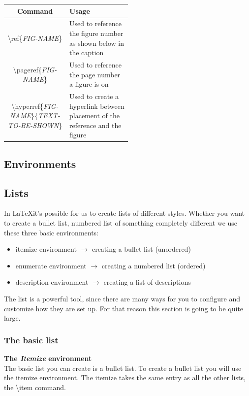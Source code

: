 \documentclass{article}
\newcommand{\bs}[1]{\textbackslash{}#1} %
\begin{document}
\begin{table}[h]
    \centering
    \begin{tabular}{|c|p{0.50\linewidth}|}
        \hline
        \rowcolor{gray!30}
        Command & Usage \\
        \hline
        \bs{ref\{\textit{FIG-NAME}\}} & Used to reference the figure number as shown below in the caption \\
        \hline
        \bs{pageref\{\textit{FIG-NAME}\}} & Used to reference the page number a figure is on \\
        \hline
        \bs{hyperref\{\textit{FIG-NAME}\}\{\textit{TEXT-TO-BE-SHOWN}\}} & Used to create a hyperlink between placement of the reference
         and the figure \\
        \hline
    \end{tabular}
\end{table}



\subsection{Environments}

\subsection{Lists}
In \LaTeX it's possible for us to create lists of different styles. Whether you want to create a bullet list, numbered list of something completely different 
we use these three basic environments:

\begin{itemize}
    \item itemize environment $\rightarrow$ creating a bullet list (unordered)
    \item enumerate environment $\rightarrow$ creating a numbered list (ordered)
    \item description environment $\rightarrow$ creating a list of descriptions 
\end{itemize}

The list is a powerful tool, since there are many ways for you to configure and customize how they are
set up. For that reason this section is going to be quite large. 

\subsubsection{The basic list}
\textbf{The \textit{Itemize} environment} \\
The basic list you can create is a bullet list. To create a bullet list you will use the itemize environment.
The itemize takes the same entry as all the other lists, the \bs{item} command.
\end{document}
